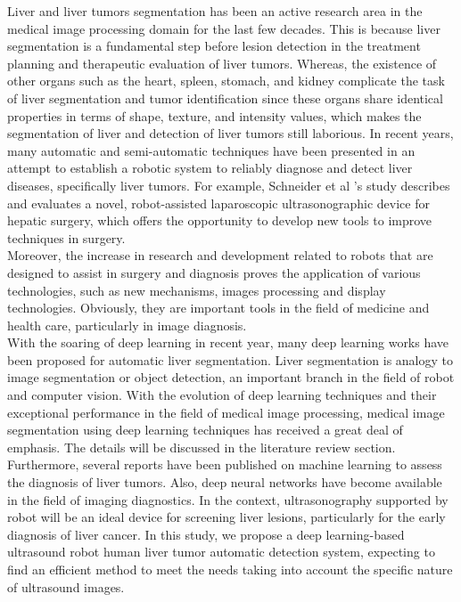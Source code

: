 \documentclass[12pt, a4paper]{article}
\begin{document}
\setlength{\parindent}{1em}
Liver and liver tumors segmentation has been an active research area in the medical image processing domain for the last few decades. This is because liver segmentation is a fundamental step before lesion detection in the treatment planning and therapeutic evaluation of liver tumors\cite{r3}. Whereas, the existence of other organs such as the heart, spleen, stomach, and kidney complicate the task of liver segmentation and tumor identification since these organs share identical properties in terms of shape, texture, and intensity values, which makes the segmentation of liver and detection of liver tumors still laborious\cite{r4}. In recent years, many automatic and semi-automatic techniques have been presented in an attempt to establish a robotic system to reliably diagnose and detect liver diseases, specifically liver tumors. For example, Schneider et al\cite{r5} ’s study describes and evaluates a novel, robot-assisted laparoscopic ultrasonographic device for hepatic surgery, which offers the opportunity to develop new tools to improve techniques in surgery.\\

\setlength{\parindent}{1em}
Moreover, the increase in research and development related to robots that are designed to assist in surgery and diagnosis proves the application of various technologies, such as new mechanisms, images processing and display technologies. Obviously, they are important tools in the field of medicine and health care, particularly in image diagnosis. \\

\setlength{\parindent}{1em}
With the soaring of deep learning in recent year, many deep learning works have been proposed for automatic liver segmentation\cite{r6,r7}. Liver segmentation is analogy to image segmentation or object detection, an important branch in the field of robot and computer vision. With the evolution of deep learning techniques and their exceptional performance in the field of medical image processing, medical image segmentation using deep learning techniques has received a great deal of emphasis. The details will be discussed in the literature review section.\\

\setlength{\parindent}{1em}
Furthermore, several reports have been published on machine learning to assess the diagnosis of liver tumors. Also, deep neural networks have become available in the field of imaging diagnostics. In the context, ultrasonography supported by robot will be an ideal device for screening liver lesions, particularly for the early diagnosis of liver cancer. In this study, we propose a deep learning-based ultrasound robot human liver tumor automatic detection system, expecting to find an efficient method to meet the needs taking into account the specific nature of ultrasound images.\\
\end{document}
